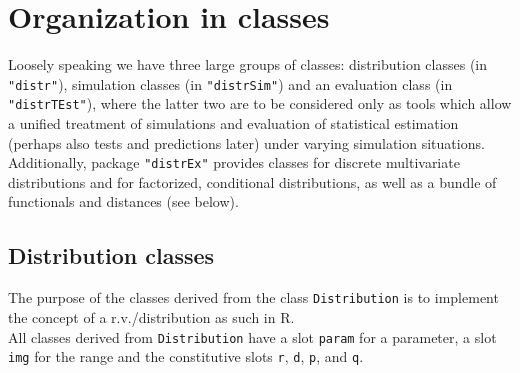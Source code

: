 \documentclass[11pt]{article}
\newcommand{\code}[1]{{\tt #1}}
\newcommand{\pkg}[1]{{\tt "#1"}}
\begin{document}
\section{Organization in classes}
Loosely speaking we have three large groups of classes: distribution classes (in 
\pkg{distr}), simulation classes (in \pkg{distrSim}) and an evaluation class (in 
\pkg{distrTEst}), where the latter two are to be considered only as tools which 
allow a unified treatment of simulations and evaluation of statistical estimation 
(perhaps also tests and predictions later) under varying simulation situations.
Additionally, package \pkg{distrEx} provides classes for discrete multivariate 
distributions and for factorized, conditional distributions, as well as a bundle of 
functionals and distances (see below).
\subsection{Distribution classes}
The purpose of the classes derived from the class \code{Distribution}  is to implement 
the concept of a r.v./distribution as such in {\sf R}.\\
All classes derived from \code{Distribution} have a slot \code{param} for a 
parameter, a slot \code{img} for the range and the constitutive slots \code{r}, 
\code{d}, \code{p}, and \code{q}.
\end{document}
